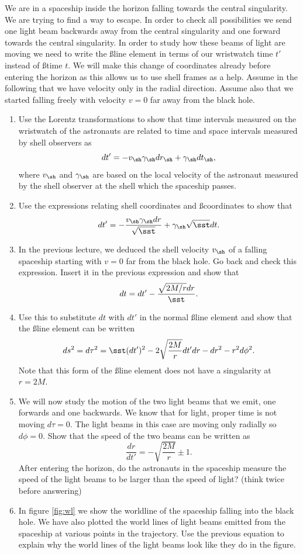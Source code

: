 \begin{multicols}{2}
We are in a spaceship inside the horizon falling towards the central singularity. We are trying to find a way to escape. In order to check all possibilities we send one light beam backwards away from the central singularity and one forward towards the central singularity. In order to study how these beams of light are moving we need to write the \ss line element in terms of our wristwatch time $t'$ instead of \ss time $t$. We will make this change of coordinates already before entering the horizon as this allows us to use shell frames as a help. Assume in the following that we have velocity only in the radial direction. Assume also that we started falling freely with velocity $v=0$ far away from the black hole.
\begin{enumerate}
\item Use the Lorentz transformations to show that time intervals measured on the wristwatch of the astronauts are related to time and space intervals measured by shell observers as
\[
dt'=-v_\sh\gamma_\sh dr_\sh+\gamma_\sh dt_\sh,
\]
where $v_\sh$ and $\gamma_\sh$ are based on the local velocity of the astronaut measured by the shell observer at the shell which the spaceship passes. 
\item Use the expressions relating shell coordinates and \ss coordinates to show that
\[
dt'=-\frac{v_\sh\gamma_\sh dr}{\sqrt{\sst}}+\gamma_\sh\sqrt{\sst}dt.
\]
\item In the previous lecture, we deduced the shell velocity $v_\sh$ of a falling spaceship starting with $v=0$ far from the black hole. Go back and check this expression. Insert it in the previous expression and show that
\[
dt=dt'-\frac{\sqrt{2M/r}dr}{\sst}.
\]
\item Use this to substitute $dt$ with $dt'$ in the normal \ss line element and show that the \ss line element can be written
\[
ds^2=d\tau^2=\sst(dt')^2-2\sqrt{\frac{2M}{r}}dt'dr-dr^2-r^2d\phi^2.
\]
Note that this form of the \ss line element does not have a singularity at $r=2M$.
\item We will now study the motion of the two light beams that we emit, one forwards and one backwards. We know that for light, proper time is not moving $d\tau=0$. The light beams in this case are moving only radially so $d\phi=0$. Show that the speed of the two beams can be written as
\[
\frac{dr}{dt'}=-\sqrt{\frac{2M}{r}}\pm1.
\]
After entering the horizon, do the astronauts in the spaceship measure the speed of the light beams to be larger than the speed of light? (think twice before answering)
\item In figure \ref{fig:wl} we show the worldline of the spaceship falling into the black hole. We have also plotted the world lines of light beams emitted from the spaceship at various points in the trajectory. Use the previous equation to explain why the world lines of the light beams look like they do in the figure.

\end{enumerate}
\end{multicols}
